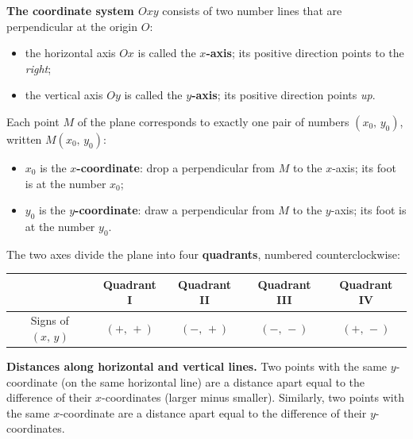 \begin{knowbox}
\textbf{The coordinate system $Oxy$} consists of two number lines that are perpendicular at the origin $O$:
\begin{itemize}[leftmargin=1.3em,itemsep=1pt,topsep=2pt]
  \item the horizontal axis $Ox$ is called the \textbf{$x$-axis}; its positive direction points to the \emph{right};
  \item the vertical axis $Oy$ is called the \textbf{$y$-axis}; its positive direction points \emph{up}.
\end{itemize}
Each point $M$ of the plane corresponds to exactly one pair of numbers $(x_0,\,y_0)$, written $M(x_0,\,y_0)$:
\begin{itemize}[leftmargin=1.3em,itemsep=1pt,topsep=2pt]
  \item $x_0$ is the \textbf{$x$-coordinate}: drop a perpendicular from $M$ to the $x$-axis; its foot is at the number $x_0$;
  \item $y_0$ is the \textbf{$y$-coordinate}: draw a perpendicular from $M$ to the $y$-axis; its foot is at the number $y_0$.
\end{itemize}
The two axes divide the plane into four \textbf{quadrants}, numbered counterclockwise:
\begin{center}
\begin{tabular}{|c|c|c|c|c|}
\hline
 & Quadrant I & Quadrant II & Quadrant III & Quadrant IV \\ \hline
Signs of $(x,\,y)$ & $(+,\,+)$ & $(-,\,+)$ & $(-,\,-)$ & $(+,\,-)$ \\ \hline
\end{tabular}
\end{center}
\textbf{Distances along horizontal and vertical lines.} Two points with the same $y$-coordinate (on the same horizontal line) are a distance apart equal to the difference of their $x$-coordinates (larger minus smaller). Similarly, two points with the same $x$-coordinate are a distance apart equal to the difference of their $y$-coordinates.
\end{knowbox}

